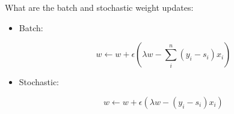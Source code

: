 \begin{Parts}
\Part What are the batch and stochastic weight updates:
\begin{itemize}
    \item Batch:
    
    \begin{solution}
    \begin{equation*}
        w \longleftarrow w + \epsilon (\lambda w - \sum_{i}^{n}(y_i - s_i)x_i)
    \end{equation*}
\end{solution}
    \item Stochastic:
    
    \begin{solution}
    \begin{equation*}
        w \longleftarrow w + \epsilon (\lambda w - (y_i - s_i)x_i)
    \end{equation*}
\end{solution}
\end{itemize}
\end{Parts}
